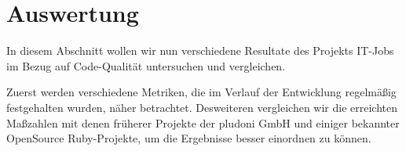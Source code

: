 \chapter{Auswertung}
\label{sec:auswertung}

In diesem Abschnitt wollen wir nun verschiedene Resultate des Projekts IT-Jobs im Bezug auf Code-Qualität untersuchen und vergleichen.

Zuerst werden verschiedene Metriken, die im Verlauf der Entwicklung regelmäßig festgehalten wurden, näher betrachtet. Desweiteren vergleichen wir die erreichten Maßzahlen mit denen früherer Projekte der pludoni GmbH und einiger bekannter OpenSource Ruby-Projekte, um die Ergebnisse besser einordnen zu können.








